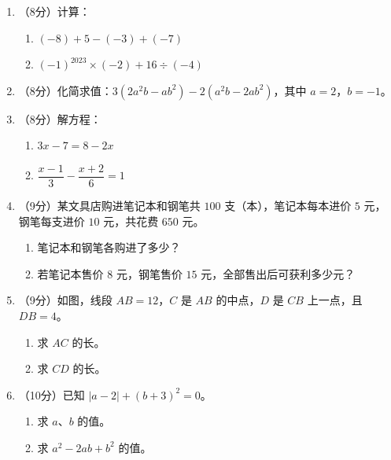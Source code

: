 \documentclass[12pt, a4paper]{ctexart}
\begin{document}
\begin{enumerate}[label=\textbf{\arabic*.}, leftmargin=2.5em, resume]

\item （8分）计算：
\begin{enumerate}[label=(\arabic*), nosep]
\item $(-8) + 5 - (-3) + (-7)$
\item $(-1)^{2023} \times (-2) + 16 \div (-4)$
\end{enumerate}
\vspace{6cm}

\item （8分）化简求值：$3(2a^2b - ab^2) - 2(a^2b - 2ab^2)$，其中 $a = 2$，$b = -1$。
\vspace{6cm}

\item （8分）解方程：
\begin{enumerate}[label=(\arabic*), nosep]
\item $3x - 7 = 8 - 2x$
\item $\dfrac{x-1}{3} - \dfrac{x+2}{6} = 1$
\end{enumerate}
\vspace{6cm}

\item （9分）某文具店购进笔记本和钢笔共 $100$ 支（本），笔记本每本进价 $5$ 元，钢笔每支进价 $10$ 元，共花费 $650$ 元。
\begin{enumerate}[label=(\arabic*), nosep]
\item 笔记本和钢笔各购进了多少？
\item 若笔记本售价 $8$ 元，钢笔售价 $15$ 元，全部售出后可获利多少元？
\end{enumerate}
\vspace{6cm}

\item （9分）如图，线段 $AB = 12$，$C$ 是 $AB$ 的中点，$D$ 是 $CB$ 上一点，且 $DB = 4$。
\begin{enumerate}[label=(\arabic*), nosep]
\item 求 $AC$ 的长。
\item 求 $CD$ 的长。
\end{enumerate}
\vspace{6cm}

\item （10分）已知 $|a - 2| + (b + 3)^2 = 0$。
\begin{enumerate}[label=(\arabic*), nosep]
\item 求 $a$、$b$ 的值。
\item 求 $a^2 - 2ab + b^2$ 的值。
\end{enumerate}
\vspace{6cm}


\end{enumerate}
\end{document}
